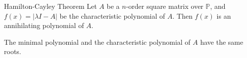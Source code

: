 \begin{theorem}{Hamilton-Cayley Theorem}{}
  Let $A$ be a $n$-order square matrix over $\mathbb{P}$,
  and $f(x) = |\lambda I - A|$ be the characteristic polynomial of $A$.
  Then $f(x)$ is an annihilating polynomial of $A$.
\end{theorem}

\begin{corollary}{}{}
  The minimal polynomial and the characteristic polynomial of $A$ have the same roots.
\end{corollary}





